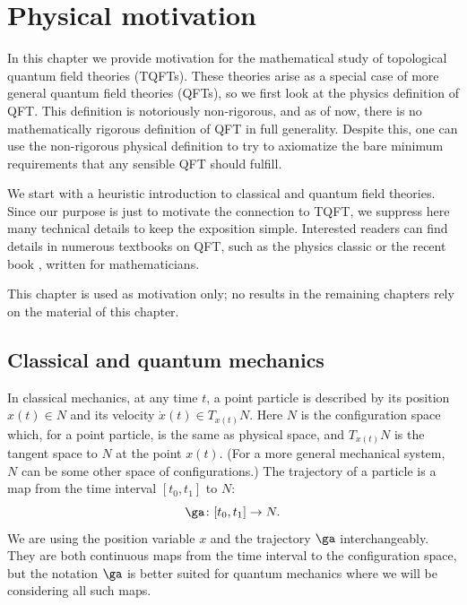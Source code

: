 \chapter{Physical motivation}\label{c:physical-motivation}
In this chapter we provide motivation for the mathematical study of topological
quantum field theories (TQFTs). These theories arise as a special case of more
general quantum field theories (QFTs), so we first look at the physics
definition of QFT. This definition is notoriously non-rigorous, and as of now,
there is no mathematically rigorous definition of QFT in full generality.
Despite this, one can use the non-rigorous physical definition to try to
axiomatize the bare minimum requirements that any sensible QFT should fulfill.

We start with a heuristic introduction to classical and quantum field theories.
Since our purpose is just to motivate the connection to TQFT, we suppress here
many technical details to keep the exposition simple. Interested readers can
find details in numerous textbooks on QFT, such as the physics classic
\cite{peskin-schroeder} or the recent book \cite{etingof-qft},
written for mathematicians.

This chapter is used as motivation only; no results in the remaining
chapters rely on the material of this chapter.


\section{Classical and quantum mechanics}\label{s:mechanics}

In classical mechanics, at any time $t$, a point particle is described by its
position $x(t) \in N$ and its velocity $\dot x(t) \in T_{x(t)}N$. Here $N$ is
the configuration space which, for a point particle, is the same as physical
space, and $T_{x(t)}N$ is the tangent space to $N$ at the point $x(t)$.
(For a more general mechanical system, $N$ can be some other space of
configurations.)
The trajectory of a particle is a map from the
time interval $[t_0,t_1]$ to $N$:
\begin{equation}
	\ga\colon[t_0,t_1] \rightarrow N. \nonumber
\end{equation}
We are using the position variable $x$ and the trajectory $\ga$
interchangeably. They are both continuous maps from the time interval to the
configuration space, but the notation $\ga$ is better suited for quantum
mechanics where we will be considering all such maps.

